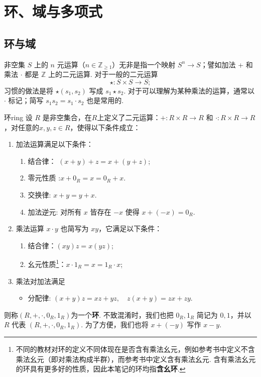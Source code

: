 \documentclass[12pt, a4paper]{ctexart}
\begin{document}
\section{环、域与多项式}
\subsection{环与域}
非空集 $S$ 上的 $n$ 元运算（$n \in \mathbb{Z}_{\geqslant 1}$）无非是指一个映射 $S^n \rightarrow S$；譬如加法 + 和乘法 $\cdot$ 都是 $\mathbb{Z}$ 上的二元运算. 对于一般的二元运算
\[
\star : S \times S \rightarrow S;
\]
习惯的做法是将 $\star(s_1, s_2)$ 写成 $s_1 \star s_2$. 对于可以理解为某种乘法的运算，通常以 $\cdot$ 标记；简写 $s_1 s_2 = s_1 \cdot s_2$ 也是常用的. 
\begin{definition}{环}{ring}
	设 $R$ 是非空集合，在$R$上定义了二元运算：$+ : R \times R \rightarrow R$ 和 $\cdot : R \times R \rightarrow R$ ，对任意的$x,y,z\in R$，使得以下条件成立：
	\begin{enumerate}
		\item 加法运算满足以下条件：
		\begin{enumerate}[(1)]
			\item 结合律： $(x + y) + z = x + (y + z)$;
			\item 零元性质 :$x + 0_R = x = 0_R + x$.
			\item 交换律: $x + y = y + x$.
			\item 加法逆元: 对所有 $x$ 皆存在 $-x$ 使得 $x + (-x) = 0_R$.
		\end{enumerate}
		\item 乘法运算 $x \cdot y$ 也简写为 $xy$，它满足以下条件：
		\begin{enumerate}[(1)]
			\item 结合律：$(xy)z = x(yz)$;
			\item 幺元性质\footnote{不同的教材对环的定义不同体现在是否含有乘法幺元，例如参考书\cite{5}中定义不含乘法幺元（即对乘法构成半群），而参考书\cite{6}中定义含有乘法幺元. 含有乘法幺元的环具有更多好的性质，因此本笔记的环均指\textbf{含幺环}. }：$x \cdot 1_R = x = 1_R \cdot x$;
		\end{enumerate}
		\item 乘法对加法满足
			\begin{itemize}
				\item 分配律: $(x + y)z = xz + yz, \quad z(x + y) = zx + zy$.
			\end{itemize}
	\end{enumerate}
	则称$(R, +, \cdot, 0_R, 1_R)$为一个\textbf{环}. 不致混淆时，我们也把 $0_R, 1_R$ 简记为 $0, 1$，并以 $R$ 代表 $(R, +, \cdot, 0_R, 1_R)$. 为了方便，我们也将 $x + (-y)$ 写作 $x - y$. 
\end{definition}
\end{document}
